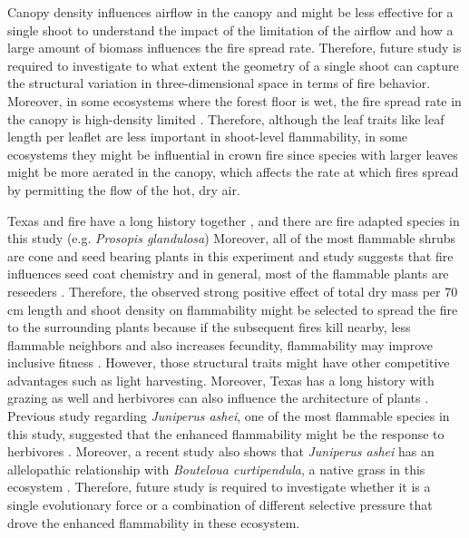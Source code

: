 \documentclass{ttuthes2007}
\begin{document}
Canopy density influences airflow in the canopy \citep{cionco1978analysis} and might be less effective for a single shoot to understand the impact of the limitation of the airflow and how a large amount of biomass influences the fire spread rate. %
Therefore, future study is required to investigate to what extent the geometry of a single shoot can capture the structural variation in three-dimensional space in terms of fire behavior. Moreover, in some ecosystems where the forest floor is wet, the fire spread rate in the canopy is high-density limited  \citep{ray2005micrometeorological}. Therefore, although the leaf traits like leaf length per leaflet are less important in shoot-level flammability, in some ecosystems they might be influential in crown fire since species with larger leaves might be more aerated in the canopy, which affects the rate at which fires spread by permitting the flow of the hot, dry air. 

Texas and fire have a long history together \citep{moir1982firehistory, stambaugh2011firehistory,stambaugh2014historicalfirehistory,smeins2005historyoffire1}, and there are fire adapted species in this study (e.g. \emph{Prosopis glandulosa}) \citep{glandulosahoney,wright1976effect} %
Moreover, all of the most flammable shrubs are cone and seed bearing plants in this experiment 
and study suggests that fire influences seed coat chemistry \citep{mcinnes2022doesseedcoatchemistry} and in general, most of the flammable plants are reseeders \citep{midgley2011pushingreseeders}. Therefore,  the observed strong positive effect of total dry mass per 70\,cm length and shoot density on flammability might be selected to spread the fire to the surrounding plants because if the subsequent fires kill nearby, less flammable neighbors and also increases fecundity, flammability may improve inclusive fitness \citep{bond1995kill}. However, those structural traits might have other competitive advantages such as light harvesting. Moreover, Texas has a long history with grazing as well and herbivores can also influence the architecture of plants \citep{danell1994browseeffects}. Previous study regarding \emph{Juniperus ashei}, one of the most flammable species in this study, suggested that the enhanced flammability might be the response to herbivores \citep{owens1998seasonal}. Moreover, a recent study also shows that \emph{Juniperus ashei} has an allelopathic relationship with \emph{Bouteloua curtipendula}, a native grass in this ecosystem \citep{young2009assessmentallelopathy}. Therefore, future study is required to investigate whether it is a single evolutionary force or a combination of different selective pressure that drove the enhanced flammability in these ecosystem.
\end{document}
